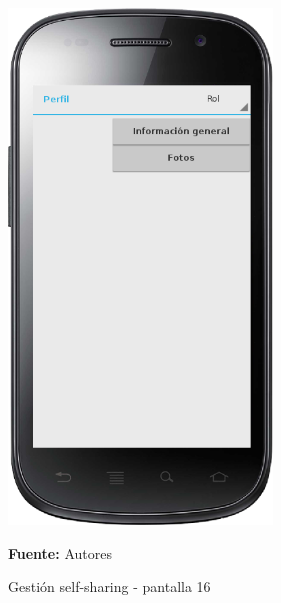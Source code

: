 \begin{figure}[!htb]
  \begin{center}
    \includegraphics[width=7cm]{./imagenes/UI/Self_sharing/self_sharing_16.png}
    \caption{Gestión self-sharing - pantalla 16}
    \label{fig:self_sharing_16}
    \textbf{Fuente:}  Autores
  \end{center}
\end{figure}

